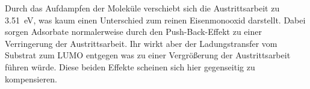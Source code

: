             Durch das Aufdampfen der Moleküle verschiebt sich die Austrittsarbeit zu \SI{3.51}{\electronvolt}, was kaum einen Unterschied zum reinen Eisenmonooxid darstellt.
            Dabei sorgen Adsorbate normalerweise durch den Push-Back-Effekt zu einer Verringerung der Austrittsarbeit.
            Ihr wirkt aber der Ladungstransfer vom Substrat zum LUMO entgegen was zu einer Vergrößerung der Austrittsarbeit führen würde.
            Diese beiden Effekte scheinen sich hier gegenseitig zu kompensieren.

  

